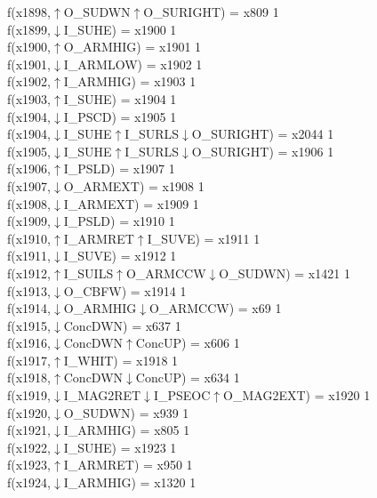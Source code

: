 f(x1898,$\uparrow$O\_SUDWN$\uparrow$O\_SURIGHT) = x809 {1} \\
f(x1899,$\downarrow$I\_SUHE) = x1900 {1} \\
f(x1900,$\uparrow$O\_ARMHIG) = x1901 {1} \\
f(x1901,$\downarrow$I\_ARMLOW) = x1902 {1} \\
f(x1902,$\uparrow$I\_ARMHIG) = x1903 {1} \\
f(x1903,$\uparrow$I\_SUHE) = x1904 {1} \\
f(x1904,$\downarrow$I\_PSCD) = x1905 {1} \\
f(x1904,$\downarrow$I\_SUHE$\uparrow$I\_SURLS$\downarrow$O\_SURIGHT) = x2044 {1} \\
f(x1905,$\downarrow$I\_SUHE$\uparrow$I\_SURLS$\downarrow$O\_SURIGHT) = x1906 {1} \\
f(x1906,$\uparrow$I\_PSLD) = x1907 {1} \\
f(x1907,$\downarrow$O\_ARMEXT) = x1908 {1} \\
f(x1908,$\downarrow$I\_ARMEXT) = x1909 {1} \\
f(x1909,$\downarrow$I\_PSLD) = x1910 {1} \\
f(x1910,$\uparrow$I\_ARMRET$\uparrow$I\_SUVE) = x1911 {1} \\
f(x1911,$\downarrow$I\_SUVE) = x1912 {1} \\
f(x1912,$\uparrow$I\_SUILS$\uparrow$O\_ARMCCW$\downarrow$O\_SUDWN) = x1421 {1} \\
f(x1913,$\downarrow$O\_CBFW) = x1914 {1} \\
f(x1914,$\downarrow$O\_ARMHIG$\downarrow$O\_ARMCCW) = x69 {1} \\
f(x1915,$\downarrow$ConcDWN) = x637 {1} \\
f(x1916,$\downarrow$ConcDWN$\uparrow$ConcUP) = x606 {1} \\
f(x1917,$\uparrow$I\_WHIT) = x1918 {1} \\
f(x1918,$\uparrow$ConcDWN$\downarrow$ConcUP) = x634 {1} \\
f(x1919,$\downarrow$I\_MAG2RET$\downarrow$I\_PSEOC$\uparrow$O\_MAG2EXT) = x1920 {1} \\
f(x1920,$\downarrow$O\_SUDWN) = x939 {1} \\
f(x1921,$\downarrow$I\_ARMHIG) = x805 {1} \\
f(x1922,$\downarrow$I\_SUHE) = x1923 {1} \\
f(x1923,$\uparrow$I\_ARMRET) = x950 {1} \\
f(x1924,$\downarrow$I\_ARMHIG) = x1320 {1} \\
